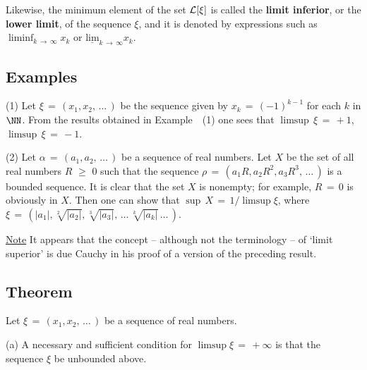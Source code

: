 {        Likewise, the minimum element of the set ${\cal L}[{\xi}]$ is called the {\bf limit inferior}, or the {\bf lower limit}, of the sequence ${\xi}$,
    and it is denoted by expressions such as ${\displaystyle \liminf_{k \,{\rightarrow}\, {\infty}} x_{k}}$ or $\underline{\mbox{lim}}_{k \,{\rightarrow}\, {\infty}} x_{k}$.

\V

            \subsection{\small{\bf Examples}}
            \label{ExamC50.160}

\V

\hspace*{\parindent}(1) Let ${\xi} \,=\, (x_{1}, x_{2},\,{\ldots}\,)$ be the sequence given by $x_{k} \,=\, (-1)^{k-1}$ for each $k$ in ${\NN}$.
    From the results obtained in Example~~(1) one sees that $\limsup\,{\xi} \,=\, +1$, $\limsup\,{\xi} \,=\, -1$.

\V

        (2) Let ${\alpha} \,=\, (a_{1}, a_{2},\,{\ldots}\,)$ be a sequence of real numbers.
    Let $X$ be the set of all real numbers $R\,\,{\geq}\,\,0$ such that the sequence ${\rho} \,=\, (a_{1}R, a_{2}R^{2}, a_{3}R^{3}, \,{\ldots}\,)$
    is a bounded sequence.
    It is clear that the set $X$ is nonempty; for example, $R \,=\, 0$ is obviously in $X$.
    Then one can show that ${\sup}\,X \,=\, 1/\limsup {\xi}$, where ${\xi}\,=\, (|a_{1}|, \sqrt[2]{|a_{2}|}, \sqrt[3]{|a_{3}|}, \,{\ldots}\,\sqrt[k]{|a_{k}|} \,{\ldots}\,)$.

        \underline{Note} It appears that the concept -- although not the terminology -- of `limit superior' is due Cauchy in his proof of a version of the preceding result.



\V


            \subsection{\small{\bf Theorem}}
            \label{ThmC50.170}

        Let ${\xi} \,=\, (x_{1},x_{2},\,{\ldots}\,)$ be a sequence of real numbers.

\V

        (a) A necessary and sufficient condition for $\limsup {\xi} \,=\, +{\infty}$ is that the sequence ${\xi}$ be unbounded above.
    
}

